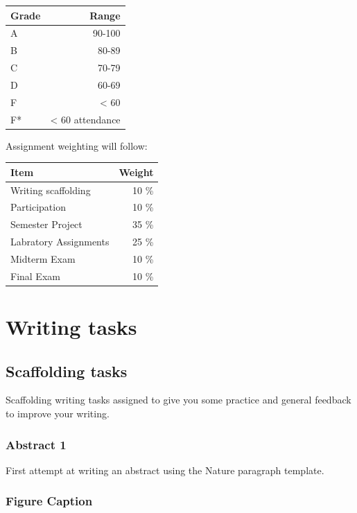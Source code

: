 \documentclass[11pt,]{article}
\begin{document}
\begin{longtable}[]{@{}lr@{}}
\toprule\noalign{}
Grade & Range \\
\midrule\noalign{}
\endhead
\bottomrule\noalign{}
\endlastfoot
A & 90-100 \\
B & 80-89 \\
C & 70-79 \\
D & 60-69 \\
F & \textless{} 60 \\
F* & \textless{} 60 attendance \\
\end{longtable}

Assignment weighting will follow:

\begin{longtable}[]{@{}lr@{}}
\toprule\noalign{}
Item & Weight \\
\midrule\noalign{}
\endhead
\bottomrule\noalign{}
\endlastfoot
Writing scaffolding & 10 \% \\
Participation & 10 \% \\
Semester Project & 35 \% \\
Labratory Assignments & 25 \% \\
Midterm Exam & 10 \% \\
Final Exam & 10 \% \\
\end{longtable}

\newpage

\section{Writing tasks}\label{writing-tasks}

\subsection{Scaffolding tasks}\label{scaffolding-tasks}

Scaffolding writing tasks assigned to give you some practice and general
feedback to improve your writing.

\subsubsection{Abstract 1}\label{abstract-1}

First attempt at writing an abstract using the Nature paragraph
template.

\subsubsection{Figure Caption}\label{figure-caption}
\end{document}
